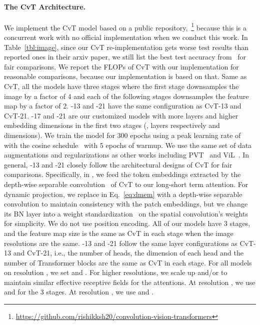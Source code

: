 \paragraph{The CvT Architecture.}
We implement the CvT model based on a public repository,~\footnote{\url{https://github.com/rishikksh20/convolution-vision-transformers} }
because {this is a concurrent work with no official implementation when we conduct this work}.
In Table~\ref{tbl:image}, since our CvT re-implementation gets worse test results than reported ones in their arxiv paper, we still list the best test accuracy from~\citet{wu2021cvt} for fair comparisons. 
We report the FLOPs of CvT with our implementation for reasonable comparisons, because our \cvtname{} implementation is based on that.
Same as CvT, all the models have three stages where the first stage downsamples the image by a factor of 4 and each of the following stages downsamples the feature map by a factor of 2. \cvtname{}-13 and \cvtname{}-21 have the same configuration as CvT-13 and CvT-21. \cvtname{}-17 and \cvtname{}-21 are our customized models with more layers and higher embedding dimensions in the first two stages (,  layers respectively and  dimensions). 
We train the model for 300 epochs using a peak learning rate of  with the cosine schedule~\citep{loshchilov2016sgdr} with 5 epochs of warmup. We use the same set of data augmentations and regularizations as other works including PVT~\cite{wang2021pyramid} and ViL~\cite{zhang2021visionlongformer}.
In general, \cvtname{}-13 and \cvtname{}-21 closely follow the architectural designs of CvT for fair comparisons. Specifically, in \cvtname{}, we feed the token embeddings extracted by the depth-wise separable convolution~\citep{chollet2017xception} of CvT to our long-short term attention. For dynamic projection, we replace  in Eq.~\eqref{eq:dmem} with a depth-wise separable convolution to maintain consistency with the patch embeddings, but we change its BN layer into a weight standardization~\citep{huang2017centered,qiao2019ws} on the spatial convolution's weights for simplicity. We do not use position encoding. All of our models have 3 stages, and the feature map size is the same as CvT in each stage when the image resolutions are the same. \cvtname{}-13 and \cvtname{}-21 follow the same layer configurations as CvT-13 and CvT-21, i.e., the number of heads, the dimension of each head and the number of Transformer blocks are the same as CvT in each stage. 
For all models on resolution , we set  and . For higher resolutions, we scale up  and/or  to maintain similar effective receptive fields for the attentions. At resolution , we use  and  for the 3 stages. At resolution , we use  and .

